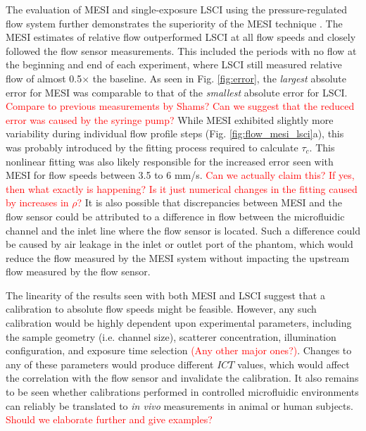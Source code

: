 \documentclass[12pt]{spieman}
\begin{document}
\begin{spacing}{2}
The evaluation of MESI and single-exposure LSCI using the pressure-regulated flow system further demonstrates the superiority of the MESI technique \cite{Kazmi:2013hp}. The MESI estimates of relative flow outperformed LSCI at all flow speeds and closely followed the flow sensor measurements. This included the periods with no flow at the beginning and end of each experiment, where LSCI still measured relative flow of almost 0.5$\times$ the baseline. As seen in Fig. \ref{fig:error}, the \textit{largest} absolute error for MESI was comparable to that of the \textit{smallest} absolute error for LSCI. \textcolor{red}{Compare to previous measurements by Shams? Can we suggest that the reduced error was caused by the syringe pump?} While MESI exhibited slightly more variability during individual flow profile steps (Fig. \ref{fig:flow_mesi_lsci}a), this was probably introduced by the fitting process required to calculate $\tau_c$. This nonlinear fitting was also likely responsible for the increased error seen with MESI for flow speeds between 3.5 to 6 mm/s. \textcolor{red}{Can we actually claim this? If yes, then what exactly is happening? Is it just numerical changes in the fitting caused by increases in $\rho$?} It is also possible that discrepancies between MESI and the flow sensor could be attributed to a difference in flow between the microfluidic channel and the inlet line where the flow sensor is located. Such a difference could be caused by air leakage in the inlet or outlet port of the phantom, which would reduce the flow measured by the MESI system without impacting the upstream flow measured by the flow sensor.

The linearity of the results seen with both MESI and LSCI suggest that a calibration to absolute flow speeds might be feasible. However, any such calibration would be highly dependent upon experimental parameters, including the sample geometry (i.e. channel size), scatterer concentration, illumination configuration, and exposure time selection \textcolor{red}{(Any other major ones?)}. Changes to any of these parameters would produce different $ICT$ values, which would affect the correlation with the flow sensor and invalidate the calibration. It also remains to be seen whether calibrations performed in controlled microfluidic environments can reliably be translated to \textit{in vivo} measurements in animal or human subjects. \textcolor{red}{Should we elaborate further and give examples?}


\end{spacing}
\end{document}
